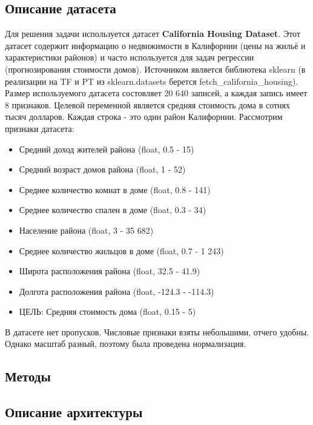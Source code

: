 \documentclass[a4paper,12pt,titlepage,final]{article}
\begin{document}
\begin{center}
\item \subsection{Описание датасета}
\end{center}

Для решения задачи используется датасет \textbf{California Housing Dataset}. Этот датасет содержит информацию о недвижимости в Калифорнии (цены на жильё и характеристики районов) и часто используется для задач регрессии (прогнозирования стоимости домов). Источником является библиотека sklearn (в реализации на TF и PT из sklearn.datasets берется fetch\_california\_housing). Размер используемого датасета состовляет 20 640 записей, а каждая запись имеет 8 признаков. Целевой переменной является средняя стоимость дома в сотнях тысяч долларов. Каждая строка - это один район Калифорнии. Рассмотрим признаки датасета:
\begin{itemize}
    \item Средний доход жителей района (float, 0.5 - 15)
    \item Средний возраст домов района (float, 1 - 52)
    \item Среднее количество комнат в доме (float, 0.8 - 141)
    \item Среднее количество спален в доме (float, 0.3 - 34)
    \item Население района (float, 3 - 35 682)
    \item Среднее количество жильцов в доме (float, 0.7 - 1 243)
    \item Широта расположения района (float, 32.5 - 41.9)
    \item Долгота расположения района (float, -124.3 - -114.3)
    \item ЦЕЛЬ: Средняя стоимость дома (float, 0.15 - 5)
\end{itemize}

В датасете нет пропусков. Числовые признаки взяты небольшими, отчего удобны. Однако масштаб разный, поэтому была проведена нормализация.
\newpage
\begin{center}
\section{Методы}
\subsection{Описание архитектуры}
\end{center}
\end{document}
